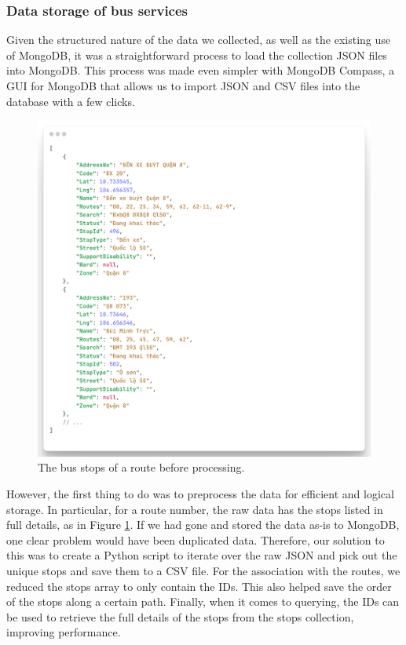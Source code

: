 \subsubsection{Data storage of bus services}
Given the structured nature of the data we collected, as well as the existing use of MongoDB, it was a straightforward process to load the collection JSON files into MongoDB. This process was made even simpler with MongoDB Compass, a GUI for MongoDB that allows us to import JSON and CSV files into the database with a few clicks.

\begin{figure}[H]
    \centering
    \includegraphics[width=\textwidth]{assets/images/Implementation/raw_stops.png}
    \caption{The bus stops of a route before processing.}
    \label{fig:raw_stops}
\end{figure}

However, the first thing to do was to preprocess the data for efficient and logical storage. In particular, for a route number, the raw data has the stops listed in full details, as in Figure \ref{fig:raw_stops}. If we had gone and stored the data as-is to MongoDB, one clear problem would have been duplicated data. Therefore, our solution to this was to create a Python script to iterate over the raw JSON and pick out the unique stops and save them to a CSV file. For the association with the routes, we reduced the stops array to only contain the IDs. This also helped save the order of the stops along a certain path. Finally, when it comes to querying, the IDs can be used to retrieve the full details of the stops from the stops collection, improving performance.

